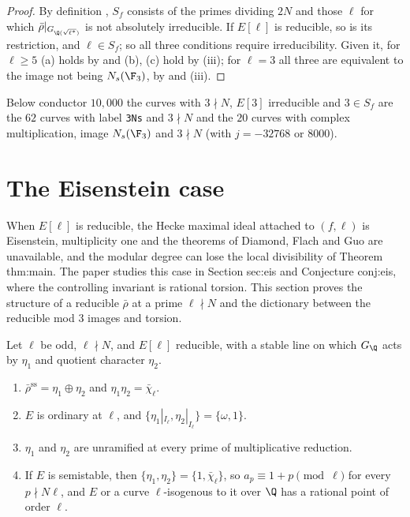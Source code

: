 \begin{proof}
By definition \cite[(31)]{DFG04}, $S_f$ consists of the primes dividing $2N$ and those $\ell$ for which $\bar\rho|_{G_{\Q(\sqrt{\ell^*})}}$ is not absolutely irreducible. If $E[\ell]$
is reducible, so is its restriction, and $\ell\in S_f$; so all three conditions require irreducibility. Given it, for $\ell\ge5$ (a) holds by
 and (b), (c) hold by (iii); for $\ell=3$ all three are equivalent to the image not being $N_s(\F_3)$, by
 and (iii).
\end{proof}

Below conductor $10{,}000$ the curves with $3\nmid N$, $E[3]$ irreducible and $3\in S_f$ are the $62$ curves with label \texttt{3Ns} and $3\nmid N$ and the
$20$ curves with complex multiplication, image $N_s(\F_3)$ and $3\nmid N$ (with $j=-32768$ or $8000$).

\section{The Eisenstein case}\label{sec:galrep:eisenstein}

When $E[\ell]$ is reducible, the Hecke maximal ideal attached to $(f,\ell)$ is Eisenstein, multiplicity one and the theorems of Diamond, Flach and
Guo are unavailable, and the modular degree can lose the local divisibility of Theorem thm:main. The paper studies this case in Section
sec:eis and Conjecture conj:eis, where the controlling invariant is rational torsion. This section proves the structure of a reducible $\bar\rho$
at a prime $\ell\nmid N$ and the dictionary between the reducible mod $3$ images and torsion.

\begin{proposition}\label{prop:galrep:reducible}
Let $\ell$ be odd, $\ell\nmid N$, and $E[\ell]$ reducible, with a stable line on which $G_\Q$ acts by $\eta_1$ and quotient character $\eta_2$.
\begin{enumerate}[label=(\roman*)]
\item $\bar\rho^{\mathrm{ss}}=\eta_1\oplus\eta_2$ and $\eta_1\eta_2=\bar\chi_\ell$.
\item $E$ is ordinary at $\ell$, and $\{\eta_1|_{I_\ell},\eta_2|_{I_\ell}\}=\{\omega,1\}$.
\item $\eta_1$ and $\eta_2$ are unramified at every prime of multiplicative reduction.
\item If $E$ is semistable, then $\{\eta_1,\eta_2\}=\{1,\bar\chi_\ell\}$, so $a_p\equiv1+p\pmod\ell$ for every $p\nmid N\ell$, and $E$ or a curve $\ell$-isogenous to it over $\Q$ has a
rational point of order $\ell$.
\end{enumerate}
\end{proposition}


